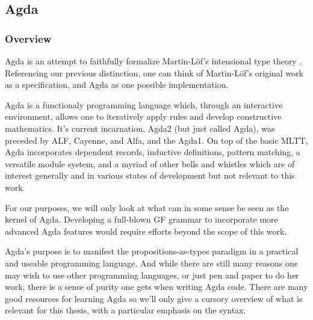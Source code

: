 \subsection{Agda}

\subsubsection{Overview}
Agda is an attempt to faithfully formalize Martin-Löf's intensional type theory
\cite{ml1984}. Referencing our previous distinction, one can think of
Martin-Löf's original work as a specification, and Agda as one possible
implementation.

Agda is a functionaly programming language which, through an interactive
environment, allows one to iteratively apply rules and develop constructive
mathematics. It's current incarnation, Agda2 (but just called Agda), was
preceded by ALF, Cayenne, and Alfa, and the Agda1. On top of the basic MLTT,
Agda incorporates dependent records, inductive definitions, pattern matching, a
versatile module system, and a myriad of other bells and whistles which are of
interest generally and in various states of development but not relevant to this
work.

For our purposes, we will only look at what can in some sense be seen as the
kernel of Agda. Developing a full-blown GF grammar to incorporate more
advanced Agda features would require efforts beyond the scope of this work.

Agda's purpose is to manifest the propositions-as-types paradigm in a practical
and useable programming language. And while there are still many reasons one may
wish to use other programming languages, or just pen and paper to do her work,
there is a sense of purity one gets when writing Agda code. There are many good
resources for learning Agda \cite{Bove2009} \cite{stump} \cite{ulf}
\cite{wadler} so we'll only give a cursory overview of what is relevant for this
thesis, with a particular emphasis on the syntax.

% 




